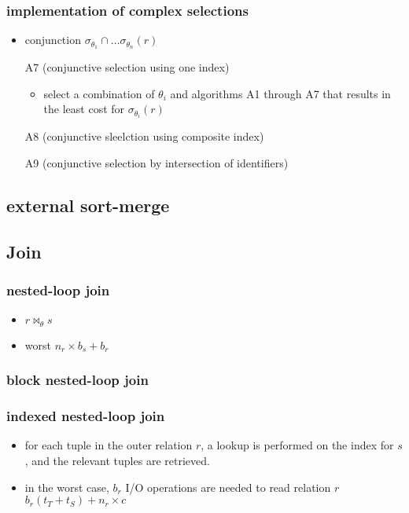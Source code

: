 \documentclass[11pt]{article}
\begin{document}
\subsubsection{implementation of complex selections}
\label{sec-18-2-4}
\begin{itemize}
\item conjunction $\sigma_{\theta_1}\cap\dots\sigma_{\theta_n}(r)$
\item[{A7 (conjunctive selection using one index)}] \begin{itemize}
\item select a combination of $\theta_i$ and algorithms A1 through A7 that
results in the least cost for $\sigma_{\theta_i}(r)$
\end{itemize}
\item[{A8 (conjunctive sleelction using composite index)}] 
\item[{A9 (conjunctive selection by intersection of identifiers)}] 
\end{itemize}
\subsection{external sort-merge}
\label{sec-18-3}
\subsection{Join}
\label{sec-18-4}
\subsubsection{nested-loop join}
\label{sec-18-4-1}
\begin{itemize}
\item $r\bowtie_{\theta} s$
\item worst
$n_r\times b_s + b_r$
\end{itemize}
\subsubsection{block nested-loop join}
\label{sec-18-4-2}
\subsubsection{indexed nested-loop join}
\label{sec-18-4-3}
\begin{itemize}
\item for each tuple in the outer relation $r$, a lookup is performed on the index
for $s$, and the relevant tuples are retrieved.
\item in the worst case, $b_r$ I/O operations are needed to read relation $r$
      $b_r(t_T+t_S)+n_r\times c$
\end{itemize}
\end{document}
